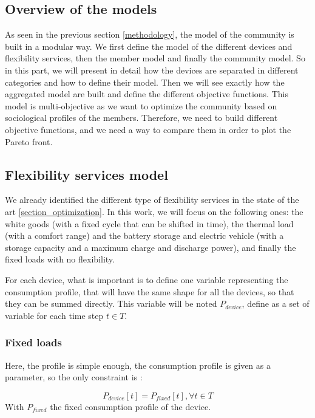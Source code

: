 \subsection{Overview of the models}

As seen in the previous section \ref{methodology}, the model of the community is built in a modular way. We first define the model of the different devices and flexibility services, then the member model and finally the community model. So in this part, we will present in detail how the devices are separated in different categories and how to define their model. Then we will see exactly how the aggregated model are built and define the different objective functions. This model is multi-objective as we want to optimize the community based on sociological profiles of the members. Therefore, we need to build different objective functions, and we need a way to compare them in order to plot the Pareto front.

\subsection{Flexibility services model}

We already identified the different type of flexibility services in the state of the art \ref{section_optimization}. In this work, we will focus on the following ones: the white goods (with a fixed cycle that can be shifted in time), the thermal load (with a comfort range) and the battery storage and electric vehicle (with a storage capacity and a maximum charge and discharge power), and finally the fixed loads with no flexibility.

For each device, what is important is to define one variable representing the consumption profile, that will have the same shape for all the devices, so that they can be summed directly. This variable will be noted $P_{device}$, define as a set of variable for each time step $t \in T$.

\subsubsection{Fixed loads}

Here, the profile is simple enough, the consumption profile is given as a parameter, so the only constraint is  :

\begin{equation} 
    P_{device}[t] = P_{fixed}[t], \forall t \in T
\end{equation}
With $P_{fixed}$ the fixed consumption profile of the device.

